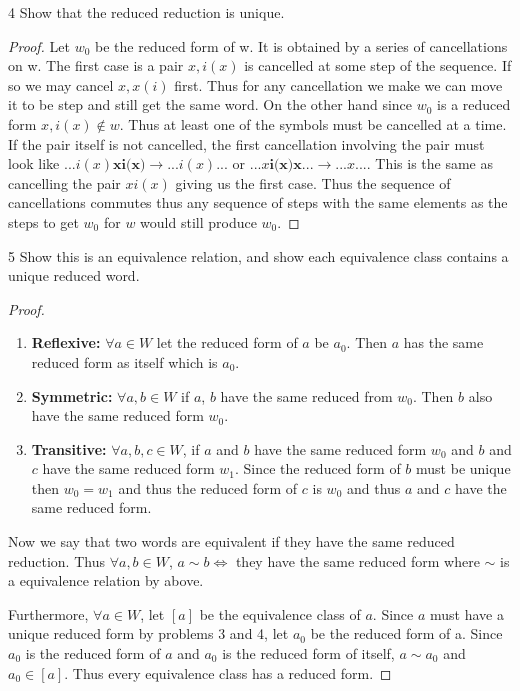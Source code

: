 \documentclass{article}
\begin{document}
\bigskip

\begin{PROB}{4}\label{Problem 4.}
    Show that the reduced reduction is unique.
\end{PROB}
\begin{proof}
    Let $w_0$ be the reduced form of w. It is obtained by a series of cancellations on w. The first case is a pair $x,i(x)$ is cancelled at some step of the sequence. If so we may cancel $x,x(i)$ first. Thus for any cancellation we make we can move it to be step and still get the same word. On the other hand since $w_0$ is a reduced form $x,i(x) \not \in w$. Thus at least one of the symbols must be cancelled at a time. If the pair itself is not cancelled, the first cancellation involving the pair must look like $...i(x)\textbf{xi(x)} \to ...i(x)...$ or $...x\textbf{i(x)x}... \to ...x...$. This is the same as cancelling the pair $xi(x)$ giving us the first case. Thus the sequence of cancellations commutes thus any sequence of steps with the same elements as the steps to get $w_0$ for $w$ would still produce $w_0$. 
\end{proof}

\bigskip

\begin{PROB}{5}\label{Problem 5.}
    Show this is an equivalence relation, and show each equivalence class contains a unique reduced word.
\end{PROB}
\begin{proof}
    \begin{enumerate}{}
        \item \textbf{Reflexive:} $\forall a \in W$ let the reduced form of $a$ be $a_0$. Then $a$ has the same reduced form as itself which is $a_0$.
        \item  \textbf{Symmetric:} $\forall a, b \in W$ if $a$, $b$ have the same reduced from $w_0$. Then $b$ also have the same reduced form $w_0$.
        \item \textbf{Transitive: } $\forall a, b, c \in W$, if $a$ and $b$ have the same reduced form $w_0$ and $b$ and $c$ have the same reduced form $w_1$. Since the reduced form of $b$ must be unique then $w_0=w_1$ and thus the reduced form of $c$ is $w_0$ and thus $a$ and $c$ have the same reduced form.
    \end{enumerate}

    Now we say that two words are equivalent if they have the same reduced reduction. Thus $\forall a, b \in W$, $a \sim b \iff $ they have the same reduced form where $\sim$ is a equivalence relation by above.

    Furthermore, $\forall a\in W$, let $[a]$ be the equivalence class of $a$. Since $a$ must have a unique reduced form by problems 3 and 4, let $a_0$ be the reduced form of a. Since $a_0$ is the reduced form of $a$ and $a_0$ is the reduced form of itself, $a \sim a_0$ and $a_0 \in [a]$. Thus every equivalence class has a reduced form.
\end{proof}
\end{document}
